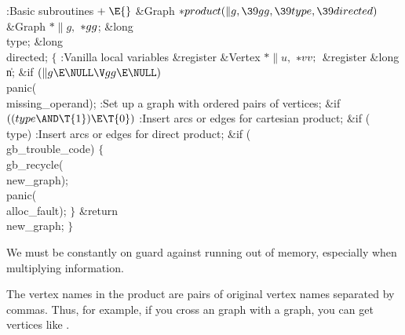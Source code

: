 \B{}:Basic subroutines\X${}\mathrel+\E{}$\6
\1\1\&{Graph} ${}{*}\\{product}(\|g,\39\\{gg},\39\\{type},\39\\{directed}){}$\6
\&{Graph} ${}{*}\|g,{}$ ${}{*}\\{gg}{}$;\6
\&{long} \\{type};%
\6
\&{long} \\{directed};\2\2\6
${}\{{}$\5
\1:Vanilla local variables\X\5
\hbox{}\6{}\&{register} \&{Vertex} ${}{*}\|u,{}$ ${}{*}\\{vv};{}$\6
\&{register} \&{long} \|n;\7
\&{if} ${}(\|g\E\NULL\V\\{gg}\E\NULL){}$\1\5
\\{panic}(\\{missing\_operand});\2\6
:Set up a graph with ordered pairs of vertices\X;\6
\&{if} ${}((\\{type}\AND\T{1})\E\T{0}){}$\1\5
:Insert arcs or edges for cartesian product\X;\2\6
\&{if} (\\{type})\1\5
:Insert arcs or edges for direct product\X;\2\6
\&{if} (\\{gb\_trouble\_code})\5
${}\{{}$\1\6
\\{gb\_recycle}(\\{new\_graph});\6
\\{panic}(\\{alloc\_fault});\6
\4${}\}{}$\2\6
\&{return} \\{new\_graph};\6
\4${}\}{}$\2\par
\fi

We must be constantly on guard against running out of memory, especially
when multiplying information.

The vertex names in the product are pairs of original vertex names separated
by commas. Thus, for example, if you cross an  graph with a 
graph, you can get vertices like .

